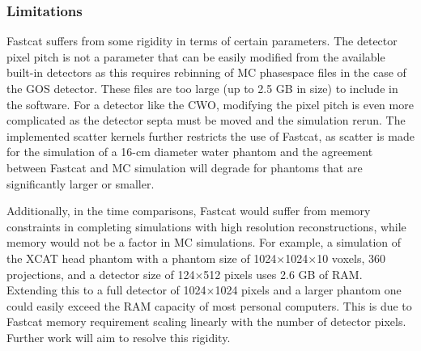 

\subsubsection{Limitations}



Fastcat suffers from some rigidity in terms of certain parameters. The detector pixel pitch is not a parameter that can be easily modified from the available built-in detectors as this requires rebinning of MC phasespace files in the case of the GOS detector. These files are too large (up to 2.5 GB in size) to include in the software. For a detector like the CWO, modifying the pixel pitch is even more complicated as the detector septa must be moved and the simulation rerun. The implemented scatter kernels further restricts the use of Fastcat, as scatter is made for the simulation of a 16-cm diameter water phantom and the agreement between Fastcat and MC simulation will degrade for phantoms that are significantly larger or smaller.

Additionally, in the time comparisons, Fastcat would suffer from memory constraints in completing simulations with high resolution reconstructions, while memory would not be a factor in MC simulations. For example, a simulation of the XCAT head phantom with a phantom size of 1024$\times$1024$\times$10 voxels, 360 projections, and a detector size of 124$\times$512 pixels uses 2.6 GB of RAM. Extending this to a full detector of 1024$\times$1024 pixels and a larger phantom one could easily exceed the RAM capacity of most personal computers. This is due to Fastcat memory requirement scaling linearly with the number of detector pixels. Further work will aim to resolve this rigidity. 

